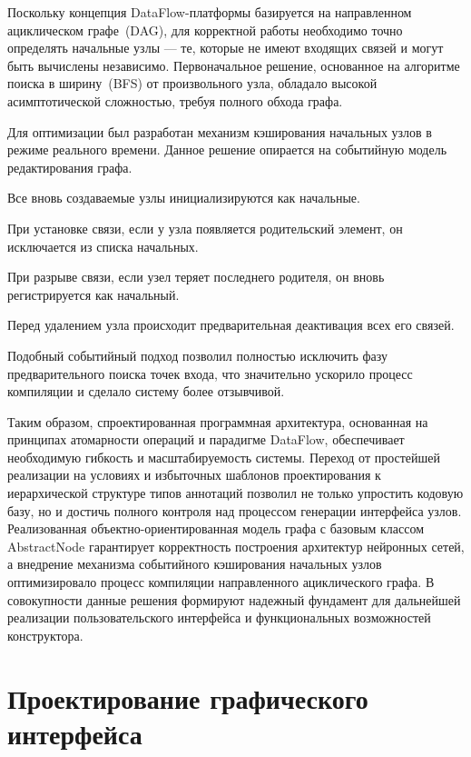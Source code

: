 \documentclass{report}
\begin{document}
Поскольку концепция DataFlow-платформы базируется на направленном ациклическом графе~(DAG), для корректной работы необходимо точно определять начальные узлы — те, которые не имеют входящих связей и могут быть вычислены независимо. Первоначальное решение, основанное на алгоритме поиска в ширину~(BFS) от произвольного узла, обладало высокой асимптотической сложностью, требуя полного обхода графа.

Для оптимизации был разработан механизм кэширования начальных узлов в режиме реального времени. Данное решение опирается на событийную модель редактирования графа.

\begin{enumarabic}
\item Все вновь создаваемые узлы инициализируются как начальные.
\item При установке связи, если у узла появляется родительский элемент, он исключается из списка начальных.
\item При разрыве связи, если узел теряет последнего родителя, он вновь регистрируется как начальный.
\item Перед удалением узла происходит предварительная деактивация всех его связей.
\end{enumarabic}

Подобный событийный подход позволил полностью исключить фазу предварительного поиска точек входа, что значительно ускорило процесс компиляции и сделало систему более отзывчивой.

Таким образом, спроектированная программная архитектура, основанная на принципах атомарности операций и парадигме DataFlow, обеспечивает необходимую гибкость и масштабируемость системы. Переход от простейшей реализации на условиях и избыточных шаблонов проектирования к иерархической структуре типов аннотаций позволил не только упростить кодовую базу, но и достичь полного контроля над процессом генерации интерфейса узлов. Реализованная объектно-ориентированная модель графа с базовым классом AbstractNode гарантирует корректность построения архитектур нейронных сетей, а внедрение механизма событийного кэширования начальных узлов оптимизировало процесс компиляции направленного ациклического графа. В совокупности данные решения формируют надежный фундамент для дальнейшей реализации пользовательского интерфейса и функциональных возможностей конструктора.


\section{Проектирование графического интерфейса}
\end{document}

